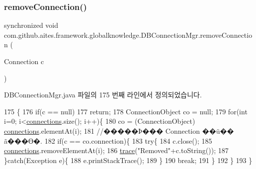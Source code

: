 \subsubsection{\texorpdfstring{remove\+Connection()}{removeConnection()}}
{\footnotesize\ttfamily synchronized void com.\+github.\+aites.\+framework.\+globalknowledge.\+D\+B\+Connection\+Mgr.\+remove\+Connection (\begin{DoxyParamCaption}\item[{Connection}]{c }\end{DoxyParamCaption})}



D\+B\+Connection\+Mgr.\+java 파일의 175 번째 라인에서 정의되었습니다.


\begin{DoxyCode}
175                                                            \{
176         \textcolor{keywordflow}{if}(c == null)
177             \textcolor{keywordflow}{return};
178         ConnectionObject co = null;
179         \textcolor{keywordflow}{for}(\textcolor{keywordtype}{int} i=0; i<\mbox{\hyperlink{classcom_1_1github_1_1aites_1_1framework_1_1globalknowledge_1_1_d_b_connection_mgr_a2a178e6371fa020ccca3e12574ef2e14}{connections}}.size(); i++)\{
180             co = (ConnectionObject) \mbox{\hyperlink{classcom_1_1github_1_1aites_1_1framework_1_1globalknowledge_1_1_d_b_connection_mgr_a2a178e6371fa020ccca3e12574ef2e14}{connections}}.elementAt(i);
181             \textcolor{comment}{//�����Ϸ��� Connection ��ü�� ã���ϴ�.}
182             \textcolor{keywordflow}{if}(c == co.connection)\{
183                 \textcolor{keywordflow}{try}\{
184                     c.close();
185                     \mbox{\hyperlink{classcom_1_1github_1_1aites_1_1framework_1_1globalknowledge_1_1_d_b_connection_mgr_a2a178e6371fa020ccca3e12574ef2e14}{connections}}.removeElementAt(i);
186                     \mbox{\hyperlink{classcom_1_1github_1_1aites_1_1framework_1_1globalknowledge_1_1_d_b_connection_mgr_ae9ff677183d99acafb2da9cd8ba6de20}{trace}}(\textcolor{stringliteral}{"Removed"}+c.toString());
187                 \}\textcolor{keywordflow}{catch}(Exception e)\{
188                     e.printStackTrace();
189                 \}
190                 \textcolor{keywordflow}{break};
191             \}
192         \}
193     \}
\end{DoxyCode}
\mbox{\label{classcom_1_1github_1_1aites_1_1framework_1_1globalknowledge_1_1_d_b_connection_mgr_a59f8c631b399c344718aee68adf05994}} 
